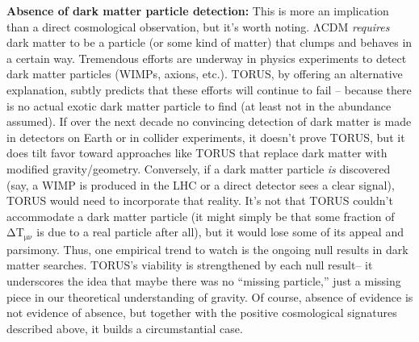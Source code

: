\documentclass[]{article}
\newcommand{\subscript}[1]{\ensuremath{_{\mathrm{#1}}}}
\begin{document}
\begin{itemize}
  \textbf{Absence of dark matter particle detection:} This is more an
  implication than a direct cosmological observation, but it's worth
  noting. ΛCDM \emph{requires} dark matter to be a particle (or some
  kind of matter) that clumps and behaves in a certain way. Tremendous
  efforts are underway in physics experiments to detect dark matter
  particles (WIMPs, axions, etc.). TORUS, by offering an alternative
  explanation, subtly predicts that these efforts will continue to fail
  -- because there is no actual exotic dark matter particle to find (at
  least not in the abundance assumed). If over the next decade no
  convincing detection of dark matter is made in detectors on Earth or
  in collider experiments, it doesn't prove TORUS, but it does tilt
  favor toward approaches like TORUS that replace dark matter with
  modified gravity/geometry. Conversely, if a dark matter particle
  \emph{is} discovered (say, a WIMP is produced in the LHC or a direct
  detector sees a clear signal), TORUS would need to incorporate that
  reality. It's not that TORUS couldn't accommodate a dark matter
  particle (it might simply be that some fraction of
  ΔT\subscript{μν} is due
  to a real particle after all), but it would lose some of its appeal
  and parsimony. Thus, one empirical trend to watch is the ongoing null
  results in dark matter searches. TORUS's viability is strengthened by
  each null result​-- it underscores the idea that maybe there was no
  ``missing particle,'' just a missing piece in our theoretical
  understanding of gravity. Of course, absence of evidence is not
  evidence of absence, but together with the positive cosmological
  signatures described above, it builds a circumstantial case.
\end{itemize}
\end{document}
